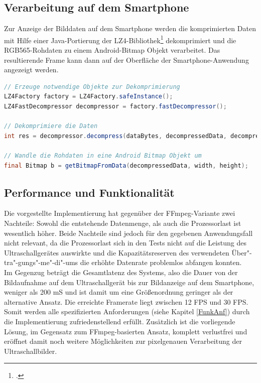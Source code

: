 \subsection{Verarbeitung auf dem Smartphone}
Zur Anzeige der Bilddaten auf dem Smartphone werden die komprimierten Daten mit Hilfe einer Java-Portierung der LZ4-Bibliothek\footcite{JPounzLZ4} dekomprimiert und die RGB565-Rohdaten zu einem Android-Bitmap Objekt verarbeitet. Das resultierende Frame kann dann auf der Oberfläche der Smartphone-Anwendung angezeigt werden.

\begin{lstlisting}[caption=Dekompression der Daten, label=lst:decompression, language=Java]
// Erzeuge notwendige Objekte zur Dekomprimierung
LZ4Factory factory = LZ4Factory.safeInstance();
LZ4FastDecompressor decompressor = factory.fastDecompressor();

// Dekomprimiere die Daten
int res = decompressor.decompress(dataBytes, decompressedData, decompressedData.length);

// Wandle die Rohdaten in eine Android Bitmap Objekt um
final Bitmap b = getBitmapFromData(decompressedData, width, height);
\end{lstlisting}

\subsection{Performance und Funktionalität}
Die vorgestellte Implementierung hat gegenüber der FFmpeg-Variante zwei Nachteile: Sowohl die entstehende Datenmenge, als auch die Prozessorlast ist wesentlich höher. Beide Nachteile sind jedoch für den gegebenen Anwendungsfall nicht relevant, da die Prozessorlast sich in den Tests nicht auf die Leistung des Ultraschallgerätes auswirkte und die Kapazitätsreserven des verwendeten Über"-tra"-gungs"-me"-di"-ums die erhöhte Datenrate problemlos abfangen konnten.\\
Im Gegenzug beträgt die Gesamtlatenz des Systems, also die Dauer von der Bildaufnahme auf dem Ultraschallgerät bis zur Bildanzeige auf dem Smartphone, weniger als 200 mS und ist damit um eine Größenordnung geringer als der alternative Ansatz. Die erreichte Framerate liegt zwischen 12 FPS und 30 FPS. Somit werden alle spezifizierten Anforderungen (siehe Kapitel \ref{FunkAnf}) durch die Implementierung zufriedenstellend erfüllt. Zusätzlich ist die vorliegende Lösung, im Gegensatz zum FFmpeg-basierten Ansatz, komplett verlustfrei und eröffnet damit noch weitere Möglichkeiten zur pixelgenauen Verarbeitung der Ultraschallbilder.

